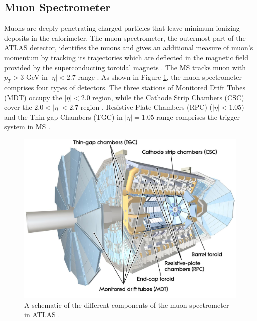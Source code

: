 \subsection{Muon Spectrometer}
\label{subsec:MS}
Muons are deeply penetrating charged particles that leave minimum ionizing deposits in the calorimeter. The muon spectrometer, the outermost part of the ATLAS detector, identifies the muons and gives an additional measure of muon's momentum by tracking its trajectories which are deflected in the magnetic field provided by the superconducting toroidal magnets \cite{ATLAS}. The MS tracks muon with $p_{T} > 3$ GeV in $|\eta| < 2.7$ range \cite{ATLAS}. As shown in Figure \ref{fig:ATLAS_MS}, the muon spectrometer comprises four types of detectors. The three stations of Monitored Drift Tubes (MDT) occupy the $|\eta| < 2.0$ region, while the Cathode Strip Chambers (CSC) cover the $2.0 < |\eta| < 2.7$ region \cite{ATLAS}. Resistive Plate Chambers (RPC) ($|\eta| < 1.05$) and the Thin-gap Chambers (TGC) in $|\eta| = 1.05$ range comprises the trigger system in MS \cite{ATLAS}. 

\begin{figure}[!htb]
    \centering
    \includegraphics[width=.98\linewidth]{figures/LHC/ATLAS_MS.jpeg}
    \caption{ A schematic of the different components of the muon spectrometer in ATLAS \cite{ATLAS}.\label{fig:ATLAS_MS}}
\end{figure}